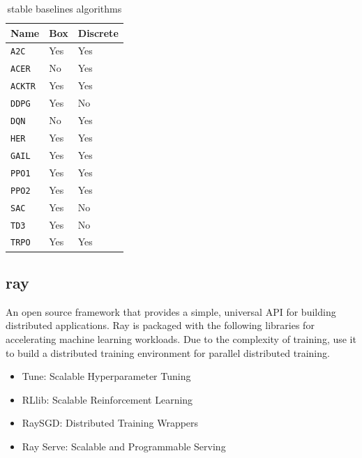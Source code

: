 \begin{table}[htbp]
\centering
\begin{tabular}{l l l} \toprule
\bfseries Name       & \bfseries Box  & \bfseries Discrete \\ \midrule
\verb#A2C#                         & Yes  &  Yes \\
\verb#ACER#                  			 & No   &  Yes \\
\verb#ACKTR#                       & Yes  &  Yes \\
\verb#DDPG#                        & Yes  &  No  \\
\verb#DQN#                         & No   &  Yes \\
\verb#HER#                         & Yes  &  Yes \\
\verb#GAIL#                        & Yes  &  Yes \\
\verb#PPO1#                        & Yes  &  Yes \\
\verb#PPO2#                        & Yes  &  Yes \\
\verb#SAC#                         & Yes  &  No  \\
\verb#TD3#                         & Yes  &  No  \\
\verb#TRPO#                        & Yes  &  Yes \\
\bottomrule
\end{tabular}
\caption{stable baselines algorithms}
\label{tab:stable-baselines}
\end{table}

\subsection{\gls{ray}}
An open source framework that provides a simple, universal API for building distributed applications. Ray is packaged with the following libraries for accelerating machine learning workloads\parencite{DBLP:journals/corr/abs-1712-05889}. Due to the complexity of training, use it to build a distributed training environment for parallel distributed training. 

\begin{itemize}
	\item Tune: Scalable Hyperparameter Tuning
	\item RLlib: Scalable Reinforcement Learning
	\item RaySGD: Distributed Training Wrappers
	\item Ray Serve: Scalable and Programmable Serving
\end{itemize}



